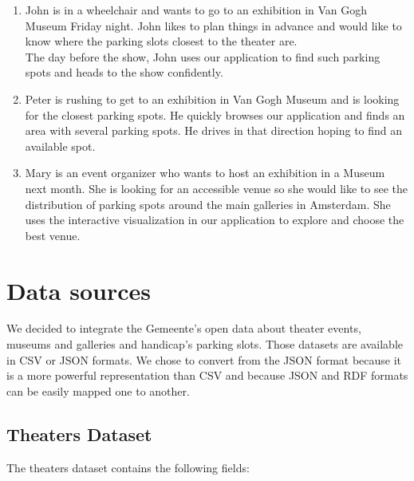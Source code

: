 \documentclass[runningheads,a4paper]{../../StyleFiles/llncs}
\begin{document}
\begin{enumerate}
	\item John is in a wheelchair and wants to go to an exhibition in Van Gogh Museum Friday night. John likes to plan things in advance and would like to know where the parking slots closest to the theater are. \\
	The day before the show, John uses our application to find such parking spots and heads to the show confidently. 
	\item Peter is rushing to get to an exhibition in Van Gogh Museum and is looking for the closest parking spots. He quickly browses our application and finds an area with several parking spots. He drives in that direction hoping to find an available spot. 
	\item Mary is an event organizer who wants to host an exhibition in a Museum next month. She is looking for an accessible venue so she would like to see the distribution of parking spots around the main galleries in Amsterdam. She uses the interactive visualization in our application to explore and choose the best venue.
\end{enumerate}


\section{Data sources}
We decided to integrate the Gemeente's open data about theater events, museums and galleries and handicap's parking slots. Those datasets are available in CSV or JSON formats. We chose to convert from the JSON format because it is a more powerful representation than CSV and because JSON and RDF formats can be easily mapped one to another.

\subsection{Theaters Dataset}
The theaters dataset contains the following fields: 
\end{document}
